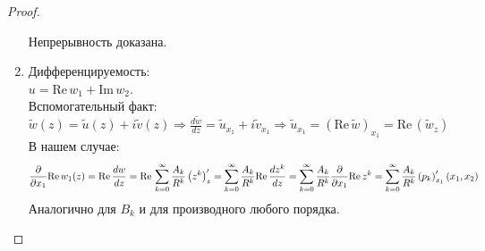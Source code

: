 \begin{proof}
\begin{enumerate}
Непрерывность доказана.
\item Дифференцируемость:\\ 
$u = \mathrm{Re}\, w_1 + \mathrm{Im}\, w_2$.\\
Вспомогательный факт: $\tilde{w}(z) = \tilde{u}(z) + i \tilde{v}(z) \Rightarrow \frac{d \tilde{w}}{d z} = \tilde{u}_{x_1} + i \tilde{v}_{x_1} \Rightarrow  \tilde{u}_{x_1} = (\mathrm{Re}\, \tilde{w})_{x_1} = \mathrm{Re}\, (\tilde{w}_z)$\\
В нашем случае: 
\[
\frac{\partial }{\partial x_1} \mathrm{Re}\, w_1(z) = \mathrm{Re}\, \frac{d w}{d z} = \mathrm{Re}\, \sum_{k=0}^{\infty} \frac{A_k}{R^k}\left(z^k\right)'_z = \sum_{k=0}^{\infty} \frac{A_k}{R^k}\mathrm{Re}\, \frac{d z^k}{d z} = \sum_{k=0}^{\infty} \frac{A_k}{R^k}\frac{\partial }{\partial x_1}\mathrm{Re}\,z^k = \sum_{k=0}^{\infty} \frac{A_k}{R^k}\left(p_k\right)'_{x_1}(x_1,x_2)
\]
Аналогично для $B_k$ и для производного любого порядка.
\end{enumerate}
\end{proof}